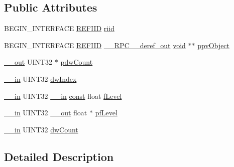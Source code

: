 \subsection*{Public Attributes}
\begin{DoxyCompactItemize}
\item 
B\+E\+G\+I\+N\+\_\+\+I\+N\+T\+E\+R\+F\+A\+CE \hyperlink{px__win__ds_8c_a80ec49c8ae61e234197d5071d2df497d}{R\+E\+F\+I\+ID} \hyperlink{struct_i_audio_stream_volume_vtbl_aa0b28249abbeee71ae2b852d9950b4ff}{riid}
\item 
B\+E\+G\+I\+N\+\_\+\+I\+N\+T\+E\+R\+F\+A\+CE \hyperlink{px__win__ds_8c_a80ec49c8ae61e234197d5071d2df497d}{R\+E\+F\+I\+ID} \hyperlink{rpcsal_8h_a23bc188526f10656f9c79d950f6c3192}{\+\_\+\+\_\+\+R\+P\+C\+\_\+\+\_\+deref\+\_\+out} \hyperlink{sound_8c_ae35f5844602719cf66324f4de2a658b3}{void} $\ast$$\ast$ \hyperlink{struct_i_audio_stream_volume_vtbl_a59cd8b13777d8692e2e9b9cb2f3fdeef}{ppv\+Object}
\item 
\hyperlink{sal_8h_abb4c3c1135aab6c47cff22e7c16efb74}{\+\_\+\+\_\+out} U\+I\+N\+T32 $\ast$ \hyperlink{struct_i_audio_stream_volume_vtbl_a2d190b0784dfb69966bb939efea621fb}{pdw\+Count}
\item 
\hyperlink{sal_8h_a3f6b8655e1aa9dfc15a9029f0343009e}{\+\_\+\+\_\+in} U\+I\+N\+T32 \hyperlink{struct_i_audio_stream_volume_vtbl_a26ffc54bae06fbae053a243667cf7615}{dw\+Index}
\item 
\hyperlink{sal_8h_a3f6b8655e1aa9dfc15a9029f0343009e}{\+\_\+\+\_\+in} U\+I\+N\+T32 \hyperlink{sal_8h_a3f6b8655e1aa9dfc15a9029f0343009e}{\+\_\+\+\_\+in} \hyperlink{getopt1_8c_a2c212835823e3c54a8ab6d95c652660e}{const} float \hyperlink{struct_i_audio_stream_volume_vtbl_a214cca90cdceed4f5f2e2b9e2b601110}{f\+Level}
\item 
\hyperlink{sal_8h_a3f6b8655e1aa9dfc15a9029f0343009e}{\+\_\+\+\_\+in} U\+I\+N\+T32 \hyperlink{sal_8h_abb4c3c1135aab6c47cff22e7c16efb74}{\+\_\+\+\_\+out} float $\ast$ \hyperlink{struct_i_audio_stream_volume_vtbl_a94c2d7ee2965c34db6b8ecdce92979d4}{pf\+Level}
\item 
\hyperlink{sal_8h_a3f6b8655e1aa9dfc15a9029f0343009e}{\+\_\+\+\_\+in} U\+I\+N\+T32 \hyperlink{struct_i_audio_stream_volume_vtbl_af2354bd92fa75d7c292aac1170bd8845}{dw\+Count}
\end{DoxyCompactItemize}


\subsection{Detailed Description}


